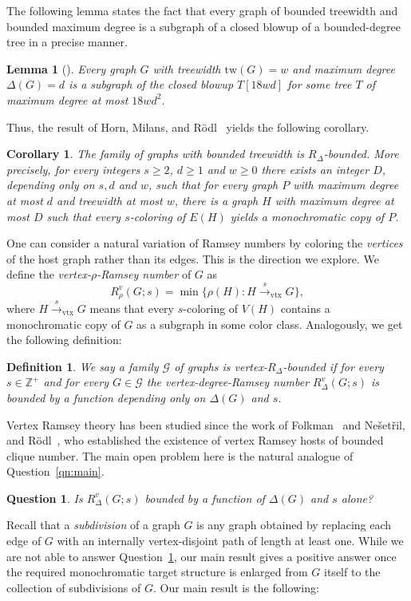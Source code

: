 \documentclass[11pt]{article}
\newtheorem{lemma}[theorem]{Lemma}
\newtheorem{corollary}[theorem]{Corollary}
\newtheorem{definition}[theorem]{Definition}
\newtheorem{question}[theorem]{Question}
\theoremstyle{definition}
\begin{document}
The following lemma states the fact that every graph of bounded treewidth and bounded maximum degree is a subgraph of a closed blowup of a bounded-degree tree in a precise manner.
\begin{lemma}[\cite{boundedtreewidth}]\label{lem:bddtreewidth}
    Every graph $G$ with treewidth $\mathrm{tw}(G) = w$ and maximum degree $\Delta(G) =  d$ is a subgraph of the closed blowup $T [18wd]$ for some tree $T$ of maximum degree at most $18wd^2$.
\end{lemma}

Thus, the result of Horn, Milans, and R\"{o}dl~\cite{HornMilansRodl2014} yields the following corollary.
 
\begin{corollary}\label{corol:bndtreewidth}
  The family of graphs with bounded treewidth is $R_\Delta$-bounded.
  More precisely, for every integers $s \ge 2$,  $d \ge 1$ and $w \ge 0$ there exists an integer $D$, depending only on $s, d$ and $w$, such that for every graph $P$ with maximum degree at most $d$ and treewidth at most $w$, there is a graph $H$ with maximum degree at most $D$ such that every $s$-coloring of $E(H)$ yields a monochromatic copy of $P$.
\end{corollary}
One can consider a natural variation of Ramsey numbers by coloring the \textit{vertices} of the host graph rather than its edges. This is the direction we explore. We define the \textit{vertex-$\rho$-Ramsey number} of $G$ as
\[
  R^v_\rho(G;s) = \min\bigl\{ \rho(H) : H \xrightarrow{s}_{\mathrm{vtx}} G \bigr\},
\]
where $H \xrightarrow{s}_{\mathrm{vtx}} G$ means that every $s$-coloring of $V(H)$ contains a
monochromatic copy of $G$ as a subgraph in some color class. Analogously, we get the following definition:

\begin{definition}
    We say a family $\mathcal{G}$ of graphs is \textit{vertex-$R_\Delta$-bounded} if for every $s\in \mathbb{Z}^+$ and for every $G \in \mathcal{G}$ the vertex-degree-Ramsey number $R^v_\Delta(G;s)$ is bounded by a function depending only on $\Delta(G)$ and $s$.
\end{definition}

 
Vertex Ramsey theory has been studied since the work of Folkman~\cite{Folkman1970} and Ne\v{s}et\v{r}il, and R\"{o}dl~\cite{NesetrilRodl1976}, who established the existence of
vertex Ramsey hosts of bounded clique number.  The main open problem here is the natural analogue of Question~\ref{qn:main}.

\begin{question}\label{qn:vertex-main}
  Is $R^v_\Delta(G;s)$ bounded by a function of $\Delta(G)$ and $s$ alone?
\end{question}
 Recall that a \textit{subdivision} of a graph $G$ is any graph obtained by replacing each edge of $G$ with an internally vertex-disjoint path of length at least one.
While we are not able to answer Question~\ref{qn:vertex-main}, our main result gives a positive answer once the required monochromatic target structure is enlarged from $G$ itself to the collection of subdivisions of $G$. Our main result is the following:
 
\end{document}
